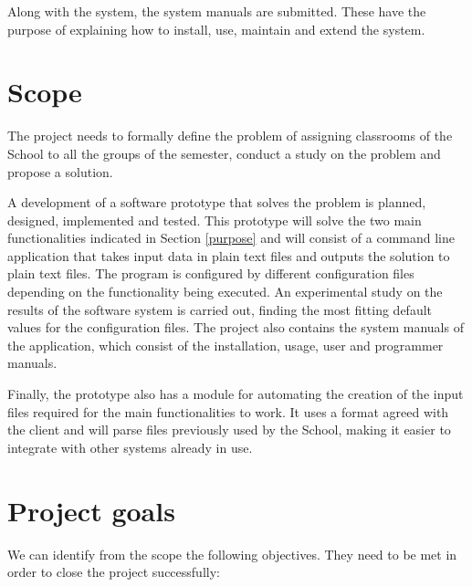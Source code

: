 Along with the system, the system manuals are submitted. These have the purpose of explaining how to install, use, maintain and extend the system.


\section{Scope}

The project needs to formally define the problem of assigning classrooms of the School to all the groups of the semester, conduct a study on the problem and propose a solution. 

A development of a software prototype that solves the problem is planned, designed, implemented and tested. This prototype will solve the two main functionalities indicated in Section \ref{purpose} and will consist of a command line application that takes input data in plain text files and outputs the solution to plain text files. The program is configured by different configuration files depending on the functionality being executed. An experimental study on the results of the software system is carried out, finding the most fitting default values for the configuration files. The project also contains the system manuals of the application, which consist of the installation, usage, user and programmer manuals. 

Finally, the prototype also has a module for automating the creation of the input files required for the main functionalities to work. It uses a format agreed with the client and will parse files previously used by the School, making it easier to integrate with other systems already in use.


\section{Project goals}

We can identify from the scope the following objectives. They need to be met in order to close the project successfully:


